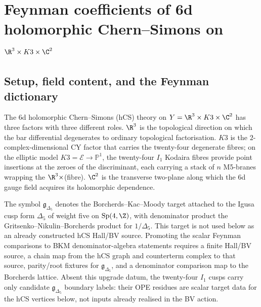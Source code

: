 \chapter{Feynman coefficients of 6d holomorphic Chern--Simons on $\R^3\times K3\times\C^2$}
\label{ch:six-d-hcs-feynman-coefficients}

\providecommand{\SCchtop}{\mathsf{SC}^{\mathrm{ch},\mathrm{top}}}
\providecommand{\FM}{\mathrm{FM}}
\providecommand{\Conf}{\mathrm{Conf}}
\providecommand{\hCS}{\mathrm{hCS}}
\providecommand{\MC}{\mathrm{MC}}
\providecommand{\Obs}{\mathsf{Obs}}
\providecommand{\cA}{\mathcal{A}}
\providecommand{\cB}{\mathcal{B}}
\providecommand{\cE}{\mathcal{E}}
\providecommand{\cL}{\mathcal{L}}
\providecommand{\cO}{\mathcal{O}}
\providecommand{\cP}{\mathcal{P}}
\providecommand{\cS}{\mathcal{S}}
\providecommand{\gfrak}{\mathfrak{g}}
\providecommand{\hfrak}{\mathfrak{h}}
\providecommand{\mfrak}{\mathfrak{m}}
\providecommand{\BKM}{\mathsf{BKM}}
\providecommand{\GT}{\mathrm{GT}}
\providecommand{\GRT}{\mathrm{GRT}}
\providecommand{\Ihnumber}[1]{I_{#1}}
\providecommand{\Id}{\mathrm{id}}
\providecommand{\MZV}{\mathcal{Z}}
\providecommand{\MMZV}{\mathcal{Z}_{\mathfrak m}}
\providecommand{\DR}{\mathrm{dR}}
\providecommand{\Res}{\mathrm{Res}}

\section{Setup, field content, and the Feynman dictionary}
\label{sec:6d-hcs-setup}

The 6d holomorphic Chern--Simons (hCS) theory on
$Y = \R^3\times K3\times \C^2$ has three factors with three different
roles. $\R^3$ is the topological direction on which the bar differential
degenerates to ordinary topological factorisation. $K3$ is the
$2$-complex-dimensional CY factor that carries the twenty-four degenerate
fibres; on the elliptic model $K3 = \cE\to \mathbb{P}^1$, the twenty-four
$\Ihnumber{1}$ Kodaira fibres provide point insertions at the zeroes of
the discriminant, each carrying a stack of $n$ M5-branes wrapping the
$\R^3\times$(fibre). $\C^2$ is the transverse two-plane along which the
6d gauge field acquires its holomorphic dependence.

The symbol $\gfrak_{\Delta_5}$ denotes the Borcherds--Kac--Moody
target attached to the Igusa cusp form $\Delta_5$ of weight five on
$\mathrm{Sp}(4,\Z)$, with denominator product the
Gritsenko--Nikulin--Borcherds product for $1/\Delta_5$. This target is
not used below as an already constructed hCS Hall/BV source. Promoting
the scalar Feynman comparisons to BKM denominator-algebra statements
requires a finite Hall/BV source, a chain map from the hCS graph and
counterterm complex to that source, parity/root fixtures for
$\gfrak_{\Delta_5}$, and a denominator comparison map to the Borcherds
lattice. Absent this upgrade datum, the twenty-four $I_1$ cusps carry
only candidate $\gfrak_{\Delta_5}$ boundary labels: their OPE residues
are scalar target data for the hCS vertices below, not inputs already
realised in the BV action.

